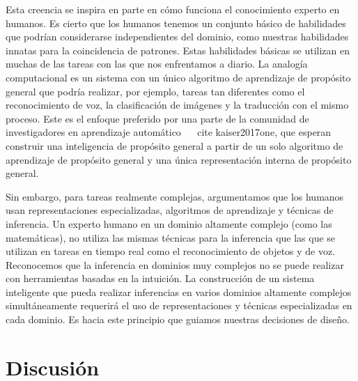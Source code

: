 Esta creencia se inspira en parte en cómo funciona el conocimiento experto en humanos. Es cierto que los humanos tenemos un conjunto básico de habilidades que podrían considerarse independientes del dominio, como nuestras habilidades innatas para la coincidencia de patrones. Estas habilidades básicas se utilizan en muchas de las tareas con las que nos enfrentamos a diario.
La analogía computacional es un sistema con un único algoritmo de aprendizaje de propósito general que podría realizar, por ejemplo, tareas tan diferentes como el reconocimiento de voz, la clasificación de imágenes y la traducción con el mismo proceso.
Este es el enfoque preferido por una parte de la comunidad de investigadores en aprendizaje automático ~ \ cite {kaiser2017one},
que esperan construir una inteligencia de propósito general a partir de un solo algoritmo de aprendizaje de propósito general y una única representación interna de propósito general.

Sin embargo, para tareas realmente complejas, argumentamos que los humanos usan representaciones especializadas, algoritmos de aprendizaje y técnicas de inferencia. Un experto humano en un dominio altamente complejo (como las matemáticas), no utiliza las mismas técnicas para la inferencia que las que se utilizan en tareas en tiempo real como el reconocimiento de objetos y de voz. Reconocemos que la inferencia en dominios muy complejos no se puede realizar con herramientas basadas en la intuición. La construcción de un sistema inteligente que pueda realizar inferencias en varios dominios altamente complejos simultáneamente requerirá el uso de representaciones y técnicas especializadas en cada dominio. Es hacia este principio que guiamos nuestras decisiones de diseño.

  \section{Discusión}
